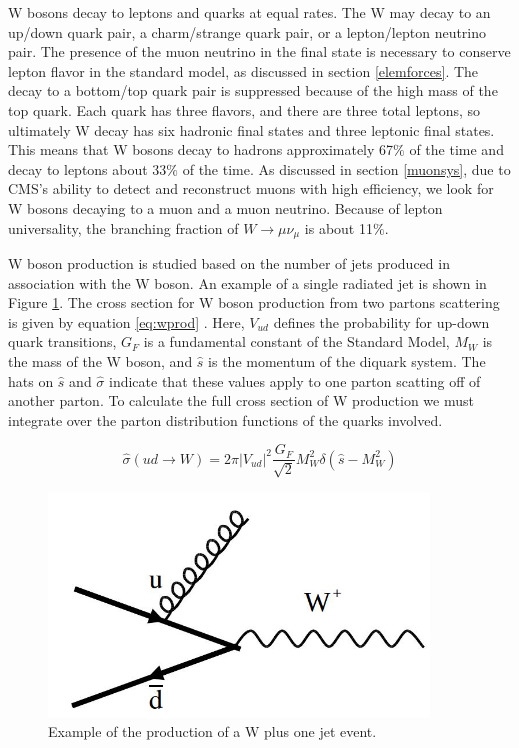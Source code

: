 \documentclass[oneside, letterpaper, oldfontcommands]{memoir}
\begin{document}
\qquad W bosons decay to leptons and quarks at equal rates. The W may decay to an up/down quark pair, a charm/strange quark pair, or a lepton/lepton neutrino pair. The presence of the muon neutrino in the final state is necessary to conserve lepton flavor in the standard model, as discussed in section \ref{elemforces}.  The decay to a bottom/top quark pair is suppressed because of the high mass of the top quark. Each quark has three flavors, and there are three total leptons, so ultimately W decay has six hadronic final states and three leptonic final states. This means that W bosons decay to hadrons approximately 67$\%$ of the time and decay to leptons about $33\%$ of the time. As discussed in section \ref{muonsys}, due to CMS's ability to detect and reconstruct muons with high efficiency, we look for W bosons decaying to a muon and a muon neutrino. Because of lepton universality, the branching fraction of $W \rightarrow \mu\nu_{\mu}$ is about 11$\%$. 

\qquad W boson production is studied based on the number of jets produced in association with the W boson. An example of a single radiated jet is shown in Figure \ref{fig:WOneJet}. The cross section for W boson production from two partons scattering is given by equation \ref{eq:wprod} \cite{Barger:0201058766}. Here, $V_{ud}$ defines the probability for up-down quark transitions, $G_{F}$ is a fundamental constant of the Standard Model, $M_{W}$ is the mass of the W boson, and $\hat{s}$ is the momentum of the diquark system. The hats on $\hat{s}$ and $\hat{\sigma}$ indicate that these values apply to one parton scatting off of another parton. To calculate the full cross section of W production we must integrate over the parton distribution functions of the quarks involved.

\begin{equation} \label{eq:wprod}
\hat{\sigma}(u d \rightarrow W) = 2\pi |V_{ud}|^{2}\frac{G_{F}}{\sqrt{2}}M_{W}^{2}\delta(\hat{s} - M_{W}^{2})
\end{equation}

\begin{figure}[here]
\includegraphics[width=0.9\textwidth]{WOneJet.jpg}
\caption{Example of the production of a W plus one jet event.}
\label{fig:WOneJet}
\end{figure}
\end{document}
